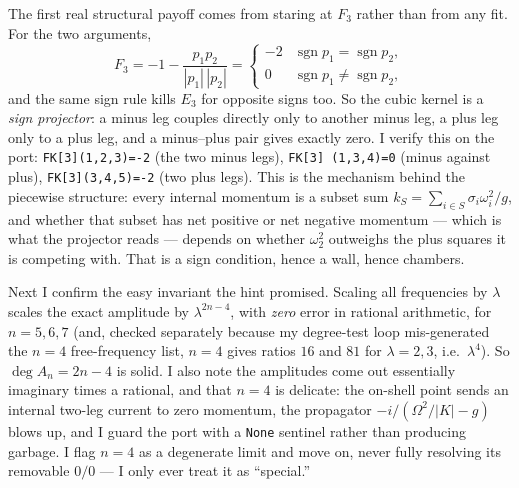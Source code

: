 \documentclass{article}
\begin{document}
The first real structural payoff comes from staring at $F_3$ rather than from any
fit. For the two arguments,
\[
F_3=-1-\frac{p_1p_2}{|p_1|\,|p_2|}=
\begin{cases}-2 & \operatorname{sgn}p_1=\operatorname{sgn}p_2,\\[2pt]
0 & \operatorname{sgn}p_1\ne\operatorname{sgn}p_2,\end{cases}
\]
and the same sign rule kills $E_3$ for opposite signs too. So the cubic kernel is a
\emph{sign projector}: a minus leg couples directly only to another minus leg, a
plus leg only to a plus leg, and a minus--plus pair gives exactly zero. I verify
this on the port: \texttt{FK[3](1,2,3)=-2} (the two minus legs), \texttt{FK[3]
(1,3,4)=0} (minus against plus), \texttt{FK[3](3,4,5)=-2} (two plus legs). This is
the mechanism behind the piecewise structure: every internal momentum is a subset
sum $k_S=\sum_{i\in S}\sigma_i\omega_i^2/g$, and whether that subset has net
positive or net negative momentum --- which is what the projector reads --- depends
on whether $\omega_2^2$ outweighs the plus squares it is competing with. That is a
sign condition, hence a wall, hence chambers.

Next I confirm the easy invariant the hint promised. Scaling all frequencies by
$\lambda$ scales the exact amplitude by $\lambda^{2n-4}$, with \emph{zero} error in
rational arithmetic, for $n=5,6,7$ (and, checked separately because my degree-test
loop mis-generated the $n=4$ free-frequency list, $n=4$ gives ratios $16$ and $81$
for $\lambda=2,3$, i.e.\ $\lambda^4$). So $\deg A_n=2n-4$ is solid. I also note the
amplitudes come out essentially imaginary times a rational, and that $n=4$ is
delicate: the on-shell point sends an internal two-leg current to zero momentum,
the propagator $-i/(\Omega^2/|K|-g)$ blows up, and I guard the port with a
\texttt{None} sentinel rather than producing garbage. I flag $n=4$ as a degenerate
limit and move on, never fully resolving its removable $0/0$ --- I only ever treat
it as ``special.''
\end{document}
